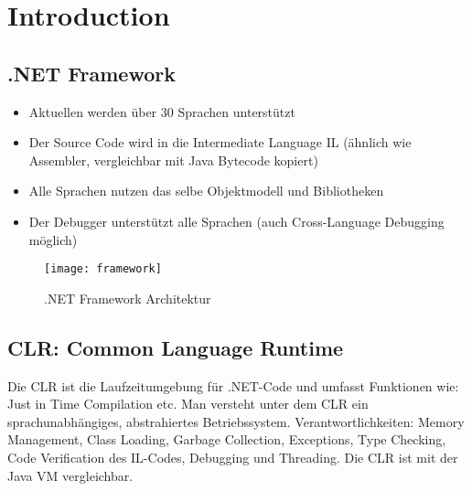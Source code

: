 
\section{Introduction}

\subsection{.NET Framework}
\begin{itemize}
  \itemsep 0em 
  \item Aktuellen werden über 30 Sprachen unterstützt
  \item Der Source Code wird in die Intermediate Language IL (ähnlich wie Assembler, vergleichbar mit Java Bytecode kopiert)
  \item Alle Sprachen nutzen das selbe Objektmodell und Bibliotheken
  \item Der Debugger unterstützt alle Sprachen (auch Cross-Language Debugging möglich)
\end{itemize}

\begin{figure}[h!]
	\centering
	\texttt{[image: framework]}
    \caption{.NET Framework Architektur}
\end{figure}

\subsection{CLR: Common Language Runtime}
Die CLR ist die Laufzeitumgebung für .NET-Code und umfasst Funktionen wie: Just in Time Compilation etc. Man versteht unter dem CLR ein sprachunabhängiges, abstrahiertes Betriebssystem. Verantwortlichkeiten: Memory Management, Class Loading, Garbage Collection, Exceptions, Type Checking, Code Verification des IL-Codes, Debugging und Threading. Die CLR ist mit der Java VM vergleichbar.

